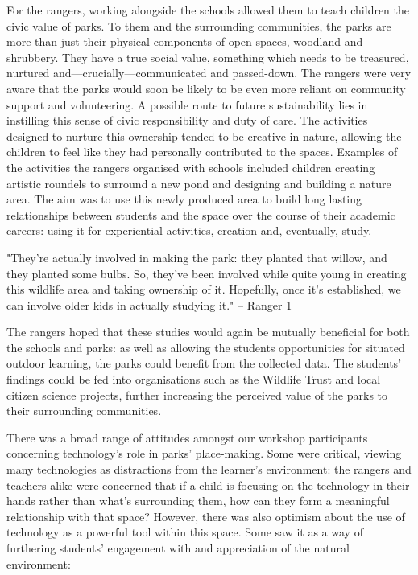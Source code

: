 For the rangers, working alongside the schools allowed them to teach children the civic value of parks. To them and the surrounding communities, the parks are more than just their physical components of open spaces, woodland and shrubbery. They have a true social value, something which needs to be treasured, nurtured and---crucially---communicated and passed-down. The rangers were very aware that the parks would soon be likely to be even more reliant on community support and volunteering. A possible route to future sustainability lies in instilling this sense of civic responsibility and duty of care. The activities designed to nurture this ownership tended to be creative in nature, allowing the children to feel like they had personally contributed to the spaces. Examples of the activities the rangers organised with schools included children creating artistic roundels to surround a new pond and designing and building a nature area. The aim was to use this newly produced area to build long lasting relationships between students and the space over the course of their academic careers: using it for experiential activities, creation and, eventually, study. 

\begin{displayquote}
"They're actually involved in making the park: they planted that willow, and they planted some bulbs. So, they've been involved while quite young in creating this wildlife area and taking ownership of it. Hopefully, once it's established, we can involve older kids in actually studying it." – Ranger 1
\end{displayquote}

The rangers hoped that these studies would again be mutually beneficial for both the schools and parks: as well as allowing the students opportunities for situated outdoor learning, the parks could benefit from the collected data. The students’ findings could be fed into organisations such as the Wildlife Trust and local citizen science projects, further increasing the perceived value of the parks to their surrounding communities.

There was a broad range of attitudes amongst our workshop participants concerning technology’s role in parks’ place-making. Some were critical, viewing many technologies as distractions from the learner’s environment: the rangers and teachers alike were concerned that if a child is focusing on the technology in their hands rather than what’s surrounding them, how can they form a meaningful relationship with that space? However, there was also optimism about the use of technology as a powerful tool within this space. Some saw it as a way of furthering students’ engagement with and appreciation of the natural environment:

